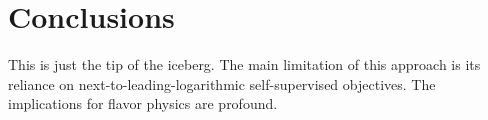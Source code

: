 \section{Conclusions}\label{sec:conclusions}

This is just the tip of the iceberg. The main limitation of this
approach is its reliance on next-to-leading-logarithmic self-supervised
objectives. The implications for flavor physics are profound.


